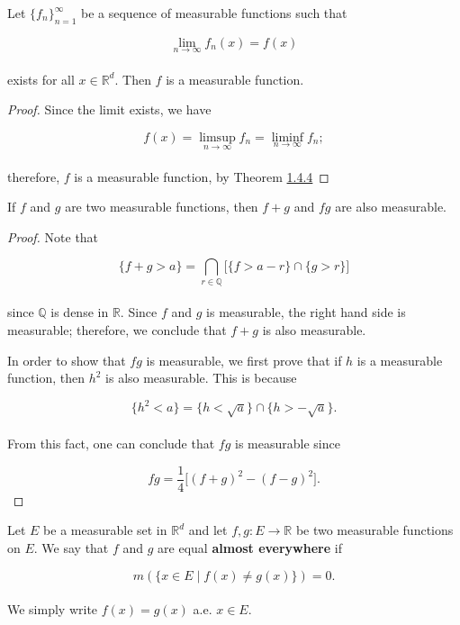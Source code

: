 \documentclass[12pt, a4paper, openany, twoside]{book}
\theoremstyle{definition}
\theoremstyle{remark}
\newcommand{\BQ}{{\mathbb {Q}}} \newcommand{\BR}{{\mathbb {R}}}
\theoremstyle{plain}
\numberwithin{equation}{section}
\begin{document}
\begin{tcolorbox}[colback=yellow!10!white,colframe=red!75!black,title=Theorem 1.4.5]\label{Theorem 1.4.5}
    Let $\{f_n\}_{n=1}^{\infty}$ be a sequence of measurable functions such that 
    
    \[\lim_{n\rightarrow\infty}{f_n(x)}=f(x)\]
    \\
    exists for all $x\in\BR^d$. Then $f$ is a measurable function.
\end{tcolorbox}
\begin{proof}
    Since the limit exists, we have

    \[f(x)=\limsup_{n\rightarrow\infty}{f_n}=\liminf_{n\rightarrow\infty}{f_n};\]
    \\
    therefore, $f$ is a measurable function, by Theorem \hyperref[Theorem 1.4.4]{1.4.4}
\end{proof}
\vspace{5mm}
\begin{tcolorbox}[colback=yellow!10!white,colframe=red!75!black,title=Theorem 1.4.6]\label{Theorem 1.4.6}
    If $f$ and $g$ are two measurable functions, then $f+g$ and $fg$ are also measurable.
\end{tcolorbox}
\begin{proof}
    Note that 

    \[\{f+g>a\}=\bigcap_{r\in\BQ}{\Big[\{f>a-r\}\cap \{g>r\}\Big]}\]
    \\
    since $\BQ$ is dense in $\BR$. Since $f$ and $g$ is measurable, the right hand side is measurable; therefore, we conclude that $f+g$ is also measurable.

    In order to show that $fg$ is measurable, we first prove that if $h$ is a measurable function, then $h^2$ is also measurable. This is because 

    \[\{h^2<a\}=\{h<\sqrt{a}\}\cap \{h>-\sqrt{a}\}.\]
    \\
    From this fact, one can conclude that $fg$ is measurable since

    \[fg=\frac{1}{4}\big[(f+g)^2-(f-g)^2\big].\]
\end{proof}
\vspace{5mm}
\begin{tcolorbox}[colback=yellow!10!white,colframe=blue!75!black,title=Definition 1.4.4]\label{Definition 1.4.4}
    Let $E$ be a measurable set in $\BR^d$ and let $f,g:E\rightarrow\BR$ be two measurable functions on $E$. We say that $f$ and $g$ are equal \textbf{almost everywhere} if 

    \[m(\{x\in E\mid f(x)\neq g(x)\})=0.\]
    \\
    We simply write $f(x)=g(x)$ a.e. $x\in E$.
\end{tcolorbox}
\vspace{5mm}
\end{document}
